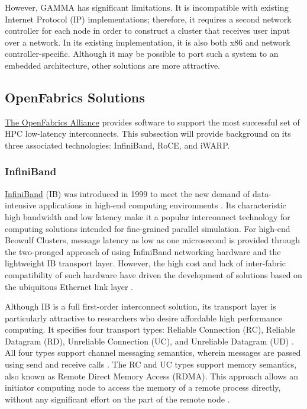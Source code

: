 \documentclass[11pt]{book}
\begin{document}
However, GAMMA has significant limitations.  It is incompatible with existing Internet
Protocol (IP) implementations; therefore, it requires a second network controller for each
node in order to construct a cluster that receives user input over a network.  In its
existing implementation, it is also both x86 and network controller-specific.  Although it
may be possible to port such a system to an embedded architecture, other solutions are
more attractive.

\subsection{OpenFabrics Solutions}

\href{www.openfabrics.org}{The OpenFabrics Alliance} provides software to support the most
successful set of HPC low-latency interconnects.  This subsection will provide background
on its three associated technologies: InfiniBand, RoCE, and iWARP.

\subsubsection{InfiniBand}

\href {www.infinibandta.org}{InfiniBand} (IB) was introduced in 1999 to meet the new
demand of data-intensive applications in high-end computing environments
\cite{InfiniBandTABase-07}.  Its characteristic high bandwidth and low latency make it a
popular interconnect technology for computing solutions intended for fine-grained parallel
simulation.  For high-end Beowulf Clusters, message latency as low as one microsecond is
provided through the two-pronged approach of using InfiniBand networking hardware and the
lightweight IB transport layer.  However, the high cost and lack of inter-fabric
compatibility of such hardware have driven the development of solutions based on the
ubiquitous Ethernet link layer \cite{roce-announce}.

Although IB is a full first-order interconnect solution, its transport layer is
particularly attractive to researchers who desire affordable high performance computing.
It specifies four transport types: Reliable Connection (RC), Reliable Datagram (RD),
Unreliable Connection (UC), and Unreliable Datagram (UD) \cite{InfiniBandTABase-07}.  All
four types support channel messaging semantics, wherein messages are passed using send and
receive calls \cite{InfiniBandTABase-07}.  The RC and UC types support memory semantics,
also known as Remote Direct Memory Access (RDMA).  This approach allows an initiator
computing node to access the memory of a remote process directly, without any significant
effort on the part of the remote node \cite{sur-11}.
\end{document}
